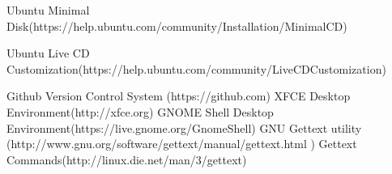 \documentclass[12pt,a4paper]{report}
\begin{document}

\begin{singlespace}

\newpage
\tableofcontents
\newpage
{}
\listoftables
{}
\listoffigures
\end{singlespace}



\flushbottom




\flushbottom \flushbottom


\newpage

%
%

\begin{thebibliography}{9}
Ubuntu Minimal Disk(https://help.ubuntu.com/community/Installation/MinimalCD)

  Ubuntu Live CD Customization(https://help.ubuntu.com/community/LiveCDCustomization) 

  Github Version Control System (https://github.com)
 XFCE Desktop Environment(http://xfce.org)
 GNOME Shell Desktop Environment(https://live.gnome.org/GnomeShell)
 GNU Gettext utility (http://www.gnu.org/software/gettext/manual/gettext.html )	
	Gettext Commands(http://linux.die.net/man/3/gettext)	
\end{thebibliography}
\end{document}

